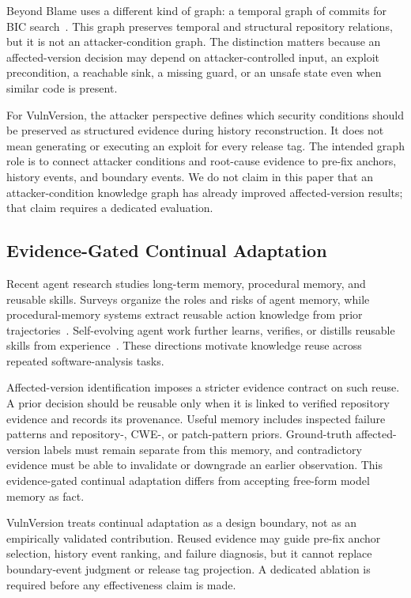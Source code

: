 Beyond Blame uses a different kind of graph: a temporal graph of commits for BIC search~\cite{beyondblame2026}. This graph preserves temporal and structural repository relations, but it is not an attacker-condition graph. The distinction matters because an affected-version decision may depend on attacker-controlled input, an exploit precondition, a reachable sink, a missing guard, or an unsafe state even when similar code is present.

For VulnVersion, the attacker perspective defines which security conditions should be preserved as structured evidence during history reconstruction. It does not mean generating or executing an exploit for every release tag. The intended graph role is to connect attacker conditions and root-cause evidence to pre-fix anchors, history events, and boundary events. We do not claim in this paper that an attacker-condition knowledge graph has already improved affected-version results; that claim requires a dedicated evaluation.

\subsection{Evidence-Gated Continual Adaptation}

Recent agent research studies long-term memory, procedural memory, and reusable skills. Surveys organize the roles and risks of agent memory, while procedural-memory systems extract reusable action knowledge from prior trajectories~\cite{agentmemorysurvey2025,memps2025}. Self-evolving agent work further learns, verifies, or distills reusable skills from experience~\cite{memskill2026,autoskill2026,coevo2026,trace2skill2026}. These directions motivate knowledge reuse across repeated software-analysis tasks.

Affected-version identification imposes a stricter evidence contract on such reuse. A prior decision should be reusable only when it is linked to verified repository evidence and records its provenance. Useful memory includes inspected failure patterns and repository-, CWE-, or patch-pattern priors. Ground-truth affected-version labels must remain separate from this memory, and contradictory evidence must be able to invalidate or downgrade an earlier observation. This evidence-gated continual adaptation differs from accepting free-form model memory as fact.

VulnVersion treats continual adaptation as a design boundary, not as an empirically validated contribution. Reused evidence may guide pre-fix anchor selection, history event ranking, and failure diagnosis, but it cannot replace boundary-event judgment or release tag projection. A dedicated ablation is required before any effectiveness claim is made.

